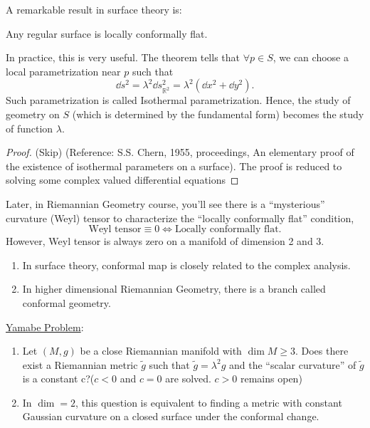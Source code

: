 A remarkable result in surface theory is: 
\begin{theorem}
    Any regular surface is locally conformally flat.
\end{theorem}
In practice, this is very useful. The theorem tells that 
\(\forall p \in S\), we can choose a local parametrization
near \(p\) such that 
\[
    \dd s^2=\lambda^2\dd s_{\mathbb{R}^2}^2=\lambda^2\left(
        \dd x^2+\dd y^2
    \right).
\]
Such parametrization is called Isothermal parametrization.
Hence, the study of geometry on \(S\) (which is determined by the
 fundamental form) becomes the study of function
\(\lambda\).
\begin{proof}
    (Skip) (Reference: S.S. Chern, 1955, proceedings, An elementary 
    proof of the existence of isothermal parameters on a surface). 
    The proof is reduced to solving some complex valued differential
    equations
\end{proof}
\begin{remark}
    Later, in Riemannian Geometry course, you'll see there is a
    ``mysterious'' curvature  (Weyl) tensor to characterize the 
    ``locally conformally flat'' condition, \ie\ 
    \[\text{Weyl tensor}\equiv 0\Leftrightarrow \text{Locally 
    conformally flat}.\]
    However, Weyl tensor is always zero on a manifold of dimension
    2 and 3.
\end{remark}
\begin{remark}
    \begin{enumerate}[(1)]
        \item In surface theory, conformal map is closely related to
         the complex analysis.
        \item In higher dimensional Riemannian Geometry, there is a
        branch called conformal geometry.
    \end{enumerate}
\end{remark}

\underline{Yamabe Problem}:
\begin{enumerate}[(1)]
    \item Let \((M,g)\) be a close Riemannian manifold with 
    \(\dim M\ge 3\). Does there exist a Riemannian metric
    \(\tilde{g}\) such that \(\tilde{g}=\lambda^2 g\) and the 
    ``scalar curvature'' of \(\tilde{g}\) is a constant c?(\(c<0\)
    and \(c=0\) are solved. \(c>0\) remains open)
    \item In \(\dim =2\), this question is equivalent to 
    finding a metric with constant Gaussian curvature on a closed
    surface under the conformal change.
\end{enumerate}